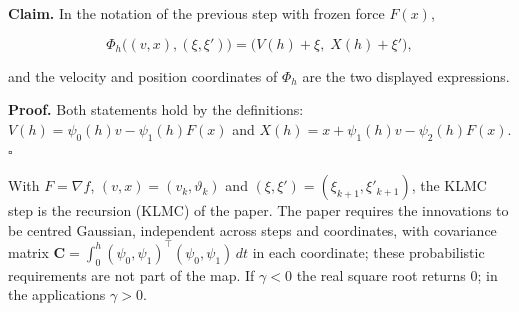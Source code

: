 \documentclass[11pt,a4paper]{article}
\begin{document}
\textbf{Claim.} In the notation of the previous step with frozen force \(F(x)\),


\[\Phi_h\bigl((v,x),(\xi,\xi')\bigr)=\bigl(V(h)+\xi,\;X(h)+\xi'\bigr),\]


and the velocity and position coordinates of \(\Phi_h\) are the two displayed expressions.




\textbf{Proof.} Both statements hold by the definitions: \(V(h)=\psi_0(h)v-\psi_1(h)F(x)\) and \(X(h)=x+\psi_1(h)v-\psi_2(h)F(x)\). \(\square\)




With \(F=\nabla f\), \((v,x)=(v_k,\vartheta_k)\) and \((\xi,\xi')=(\xi_{k+1},\xi'_{k+1})\), the KLMC step is the recursion (KLMC) of the paper. The paper requires the innovations to be centred Gaussian, independent across steps and coordinates, with covariance matrix \(\mathbf C=\int_0^h(\psi_0,\psi_1)^\top(\psi_0,\psi_1)\,dt\) in each coordinate; these probabilistic requirements are not part of the map. If \(\gamma<0\) the real square root returns \(0\); in the applications \(\gamma>0\).
\end{document}
